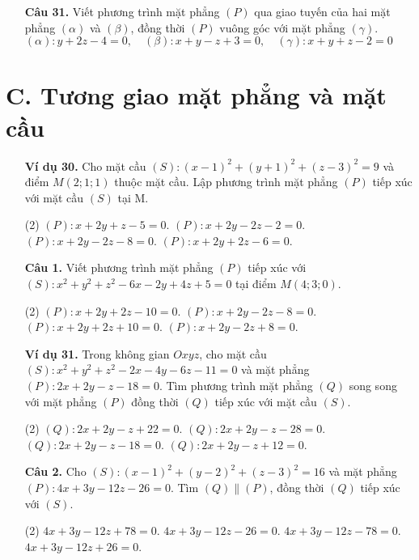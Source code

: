 \documentclass[12pt, a4paper]{article}
\begin{document}
\begin{enumerate}[label=\textbf{\arabic*.}, wide=0pt, leftmargin=*]
    \item[\textbf{Câu 31.}] Viết phương trình mặt phẳng \((P)\) qua giao tuyến của hai mặt phẳng \((\alpha)\) và \((\beta)\), đồng thời \((P)\) vuông góc với mặt phẳng \((\gamma)\).\\
    \((\alpha): y+2z-4=0, \quad (\beta): x+y-z+3=0, \quad (\gamma): x+y+z-2=0\)
\end{enumerate}


\section*{C. Tương giao mặt phẳng và mặt cầu}
\begin{enumerate}[label=\textbf{\arabic*.}, wide=0pt, leftmargin=*]
    \item[\textbf{Ví dụ 30.}] Cho mặt cầu \((S): (x-1)^2 + (y+1)^2 + (z-3)^2 = 9\) và điểm \(M(2;1;1)\) thuộc mặt cầu. Lập phương trình mặt phẳng \((P)\) tiếp xúc với mặt cầu \((S)\) tại M.
    \begin{tasks}(2)
        \task \((P): x+2y+z-5=0\).
        \task \((P): x+2y-2z-2=0\).
        \task \((P): x+2y-2z-8=0\).
        \task \((P): x+2y+2z-6=0\).
    \end{tasks}
    
    \item[\textbf{Câu 1.}] Viết phương trình mặt phẳng \((P)\) tiếp xúc với \((S): x^2+y^2+z^2-6x-2y+4z+5=0\) tại điểm \(M(4;3;0)\).
    \begin{tasks}(2)
        \task \((P): x+2y+2z-10=0\).
        \task \((P): x+2y-2z-8=0\).
        \task \((P): x+2y+2z+10=0\).
        \task \((P): x+2y-2z+8=0\).
    \end{tasks}
    
    \item[\textbf{Ví dụ 31.}] Trong không gian \(Oxyz\), cho mặt cầu \((S): x^2+y^2+z^2-2x-4y-6z-11=0\) và mặt phẳng \((P): 2x+2y-z-18=0\). Tìm phương trình mặt phẳng \((Q)\) song song với mặt phẳng \((P)\) đồng thời \((Q)\) tiếp xúc với mặt cầu \((S)\).
    \begin{tasks}(2)
        \task \((Q): 2x+2y-z+22=0\).
        \task \((Q): 2x+2y-z-28=0\).
        \task \((Q): 2x+2y-z-18=0\).
        \task \((Q): 2x+2y-z+12=0\).
    \end{tasks}
    
    
    \item[\textbf{Câu 2.}] Cho \((S): (x-1)^2+(y-2)^2+(z-3)^2 = 16\) và mặt phẳng \((P): 4x+3y-12z-26=0\). Tìm \((Q)\parallel(P)\), đồng thời \((Q)\) tiếp xúc với \((S)\).
    \begin{tasks}(2)
        \task \(4x+3y-12z+78=0\).
        \task \(4x+3y-12z-26=0\).
        \task \(4x+3y-12z-78=0\).
        \task \(4x+3y-12z+26=0\).
    \end{tasks}
    

\end{enumerate}
\end{document}
